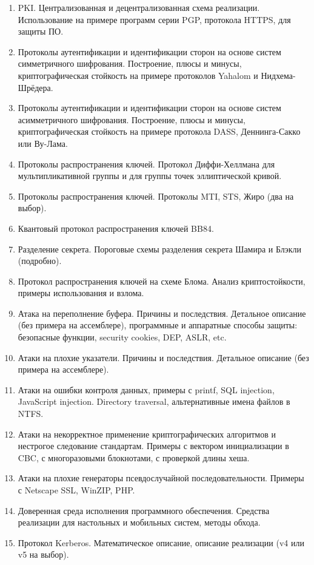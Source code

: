 \begin{enumerate}
    \item PKI. Централизованная и децентрализованная схема реализации. Использование на примере программ серии PGP, протокола HTTPS, для защиты ПО.
    \item Протоколы аутентификации и идентификации сторон на основе систем симметричного шифрования. Построение, плюсы и минусы, криптографическая стойкость на примере протоколов Yahalom и Нидхема-Шрёдера.
    \item Протоколы аутентификации и идентификации сторон на основе систем асимметричного шифрования. Построение, плюсы и минусы, криптографическая стойкость на примере протокола DASS, Деннинга-Сакко или Ву-Лама.
    \item Протоколы распространения ключей. Протокол Диффи-Хелл\-ма\-на для мультипликативной группы и для группы точек эллиптической кривой.
    \item Протоколы распространения ключей. Протоколы MTI, STS, Жиро (два на выбор).
    \item Квантовый протокол распространения ключей BB84.
    \item Разделение секрета. Пороговые схемы разделения секрета Шамира и Блэкли (подробно).
    \item Протокол распространения ключей на схеме Блома. Анализ криптостойкости, примеры использования и взлома.
    \item Атака на переполнение буфера. Причины и последствия. Детальное описание (без примера на ассемблере), программные и аппаратные способы защиты: безопасные функции, security cookies, DEP, ASLR, etc.
    \item Атаки на плохие указатели. Причины и последствия. Детальное описание (без примера на ассемблере).
    \item Атаки на ошибки контроля данных, примеры с printf, \foreignlanguage{english}{SQL injection, JavaScript injection. Directory traversal}, альтернативные имена файлов в NTFS.
    \item Атаки на некорректное применение криптографических алгоритмов и нестрогое следование стандартам. Примеры с вектором инициализации в CBC, с многоразовыми блокнотами, с проверкой длины хеша.
    \item Атаки на плохие генераторы псевдослучайной последовательности. Примеры с Netscape SSL, WinZIP, PHP.
    \item Доверенная среда исполнения программного обеспечения. Средства реализации для настольных и мобильных систем, методы обхода.
    \item Протокол Kerberos. Математическое описание, описание реализации (v4 или v5 на выбор).

\end{enumerate}
